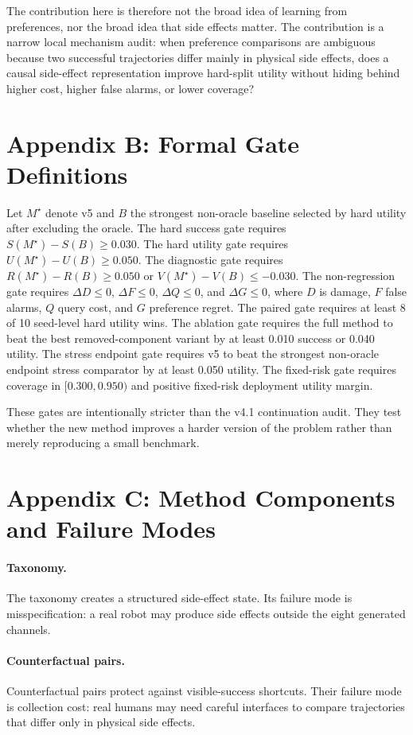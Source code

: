 \documentclass{article}
\begin{document}
The contribution here is therefore not the broad idea of learning from preferences, nor the broad idea that side effects matter. The contribution is a narrow local mechanism audit: when preference comparisons are ambiguous because two successful trajectories differ mainly in physical side effects, does a causal side-effect representation improve hard-split utility without hiding behind higher cost, higher false alarms, or lower coverage?

\section*{Appendix B: Formal Gate Definitions}
Let $M^\star$ denote v5 and $B$ the strongest non-oracle baseline selected by hard utility after excluding the oracle. The hard success gate requires $S(M^\star)-S(B)\ge 0.030$. The hard utility gate requires $U(M^\star)-U(B)\ge 0.050$. The diagnostic gate requires $R(M^\star)-R(B)\ge 0.050$ or $V(M^\star)-V(B)\le -0.030$. The non-regression gate requires $\Delta D\le 0$, $\Delta F\le 0$, $\Delta Q\le 0$, and $\Delta G\le 0$, where $D$ is damage, $F$ false alarms, $Q$ query cost, and $G$ preference regret. The paired gate requires at least 8 of 10 seed-level hard utility wins. The ablation gate requires the full method to beat the best removed-component variant by at least 0.010 success or 0.040 utility. The stress endpoint gate requires v5 to beat the strongest non-oracle endpoint stress comparator by at least 0.050 utility. The fixed-risk gate requires coverage in $[0.300,0.950)$ and positive fixed-risk deployment utility margin.

These gates are intentionally stricter than the v4.1 continuation audit. They test whether the new method improves a harder version of the problem rather than merely reproducing a small benchmark.

\section*{Appendix C: Method Components and Failure Modes}
\paragraph{Taxonomy.} The taxonomy creates a structured side-effect state. Its failure mode is misspecification: a real robot may produce side effects outside the eight generated channels.

\paragraph{Counterfactual pairs.} Counterfactual pairs protect against visible-success shortcuts. Their failure mode is collection cost: real humans may need careful interfaces to compare trajectories that differ only in physical side effects.
\end{document}
